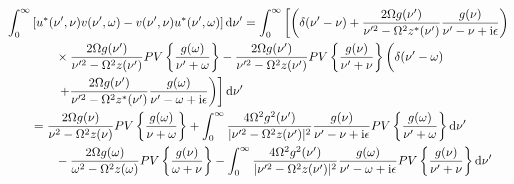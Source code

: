 \begin{equation}\label{eq:uv-minus-vu-integral}
\begin{split}
\int_0^\infty&\left[u^*(\nu',\nu)v(\nu',\omega) - v(\nu',\nu)u^*(\nu',\omega)\right]\mathrm{d}\nu' = \int_0^\infty\left[\left(\delta(\nu' - \nu) + \frac{2\Omega g(\nu')}{\nu'^2 - \Omega^2z^*(\nu')}\frac{g(\nu)}{\nu' - \nu + \mathrm{i}\epsilon}\right)\right.\\
&\qquad\times\frac{2\Omega g(\nu')}{\nu'^2 - \Omega^2z(\nu')}PV\left\{\frac{g(\omega)}{\nu' + \omega}\right\} - \frac{2\Omega g(\nu')}{\nu'^2 - \Omega^2z(\nu')}PV\left\{\frac{g(\nu)}{\nu' + \nu}\right\}\left( \vphantom{\frac{2\Omega g(\nu')}{\nu'^2 - \Omega^2z^*(\nu')}} \delta(\nu' - \omega)\right.\\
&\qquad\left.\left. + \frac{2\Omega g(\nu')}{\nu'^2 - \Omega^2z^*(\nu')}\frac{g(\omega)}{\nu' - \omega + \mathrm{i}\epsilon}\right)\right]\mathrm{d}\nu'\\
&= \frac{2\Omega g(\nu)}{\nu^2 - \Omega^2z(\nu)}PV\left\{\frac{g(\omega)}{\nu + \omega}\right\} + \int_0^\infty\frac{4\Omega^2g^2(\nu')}{|\nu'^2 - \Omega^2z(\nu')|^2}\frac{g(\nu)}{\nu' - \nu + \mathrm{i}\epsilon}PV\left\{\frac{g(\omega)}{\nu' + \omega}\right\}\mathrm{d}\nu'\\
&\qquad - \frac{2\Omega g(\omega)}{\omega^2 - \Omega^2z(\omega)}PV\left\{\frac{g(\nu)}{\omega + \nu}\right\} - \int_0^\infty\frac{4\Omega^2g^2(\nu')}{|\nu'^2 - \Omega^2z(\nu')|^2}\frac{g(\omega)}{\nu' - \omega + \mathrm{i}\epsilon}PV\left\{\frac{g(\nu)}{\nu' + \nu}\right\}\mathrm{d}\nu'\\

\end{split}
\end{equation}

